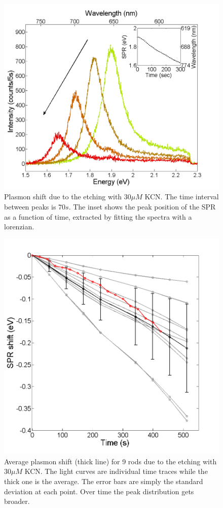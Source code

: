 \documentclass[twocolumn]{article}
\begin{document}
\begin{figure}[tp]
 \centering
 \includegraphics[width=0.95\linewidth]{plasmon_single_rod.png}
 \caption{Plasmon shift due to the etching with $30\mu M$ KCN. The time
 interval between peaks is $70s$. The inset shows the peak position of the SPR as a
 function of time, extracted by fitting the spectra with a lorenzian.}
 \label{fig:plasmon_single_rod}
\end{figure}

\begin{figure}[tp]
 \centering
 \includegraphics[width=0.95\linewidth]{plasmon_average.png}
 \caption{Average plasmon shift (thick line) for 9 rods due to the etching with
 $30\mu M$ KCN. The light curves are individual time traces while the thick one
 is the average. The error bars are simply the standard deviation at each point. Over
 time the peak distribution gets broader.}
 \label{fig:plasmon_average}
\end{figure}
\end{document}
